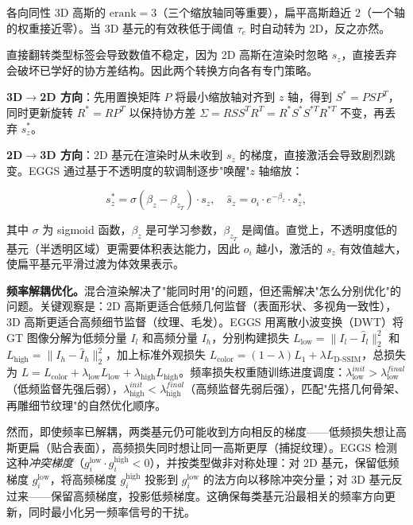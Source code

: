 各向同性 3D 高斯的 $\mathrm{erank}=3$（三个缩放轴同等重要），扁平高斯趋近 $2$（一个轴的权重接近零）。当 3D 基元的有效秩低于阈值 $\tau_e$ 时自动转为 2D，反之亦然。

直接翻转类型标签会导致数值不稳定，因为 2D 高斯在渲染时忽略 $s_z$，直接丢弃会破坏已学好的协方差结构。因此两个转换方向各有专门策略。

\textbf{3D$\to$2D 方向}：先用置换矩阵 $P$ 将最小缩放轴对齐到 $z$ 轴，得到 $S^* = PSP^T$，同时更新旋转 $R^* = RP^T$ 以保持协方差 $\Sigma = RSS^TR^T = R^*S^*S^{*T}R^{*T}$ 不变，再丢弃 $s_z^*$。

\textbf{2D$\to$3D 方向}：2D 基元在渲染时从未收到 $s_z$ 的梯度，直接激活会导致剧烈跳变。EGGS 通过基于不透明度的软调制逐步"唤醒"$z$ 轴缩放：

\begin{equation}
s_z^* = \sigma(\beta_z - \beta_{z_T}) \cdot s_z, \quad \hat{s}_z = o_i \cdot e^{-\beta_z} \cdot s_z^*,
\end{equation}

其中 $\sigma$ 为 sigmoid 函数，$\beta_z$ 是可学习参数，$\beta_{z_T}$ 是阈值。直觉上，不透明度低的基元（半透明区域）更需要体积表达能力，因此 $o_i$ 越小，激活的 $s_z$ 有效值越大，使扁平基元平滑过渡为体效果表示。

\textbf{频率解耦优化。}混合渲染解决了"能同时用"的问题，但还需解决"怎么分别优化"的问题。关键观察是：2D 高斯更适合低频几何监督（表面形状、多视角一致性），3D 高斯更适合高频细节监督（纹理、毛发）。EGGS 用离散小波变换（DWT）将 GT 图像分解为低频分量 $I_l$ 和高频分量 $I_h$，分别构建损失 $L_\text{low}=\|I_l-\hat{I}_l\|_2^2$ 和 $L_\text{high}=\|I_h-\hat{I}_h\|_2^2$，加上标准外观损失 $L_\text{color} = (1-\lambda)L_1 + \lambda L_\text{D-SSIM}$，总损失为 $L = L_\text{color} + \lambda_\text{low} L_\text{low} + \lambda_\text{high} L_\text{high}$。频率损失权重随训练进度调度：$\lambda_\text{low}^{init} > \lambda_\text{low}^{final}$（低频监督先强后弱），$\lambda_\text{high}^{init} < \lambda_\text{high}^{final}$（高频监督先弱后强），匹配"先搭几何骨架、再雕细节纹理"的自然优化顺序。

然而，即使频率已解耦，两类基元仍可能收到方向相反的梯度——低频损失想让高斯更扁（贴合表面），高频损失同时想让同一高斯更厚（捕捉纹理）。EGGS 检测这种\emph{冲突梯度}（$g_i^\text{low} \cdot g_i^\text{high} < 0$），并按类型做非对称处理：对 2D 基元，保留低频梯度 $g_i^\text{low}$，将高频梯度 $g_i^\text{high}$ 投影到 $g_i^\text{low}$ 的法方向以移除冲突分量；对 3D 基元反过来——保留高频梯度，投影低频梯度。这确保每类基元沿最相关的频率方向更新，同时最小化另一频率信号的干扰。

